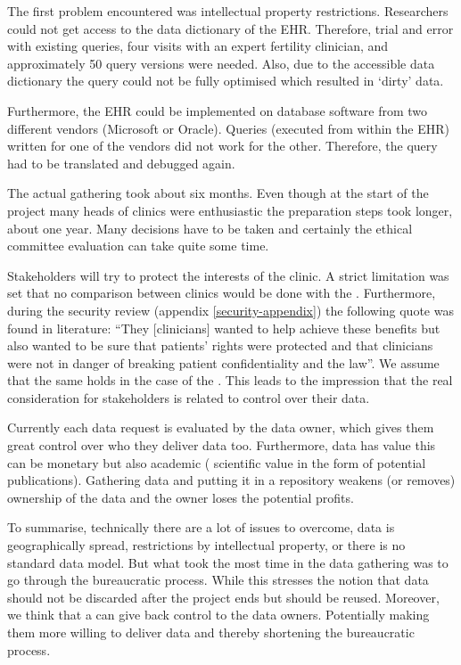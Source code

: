 The first problem encountered was intellectual property restrictions.
Researchers could not get access to the data dictionary of the EHR.
Therefore, trial and error with existing queries, four visits with an expert fertility clinician, and approximately 50 query versions were needed.
Also, due to the accessible data dictionary the query could not be fully optimised which resulted in `dirty' data.

Furthermore, the EHR could be implemented on database software from two different vendors (Microsoft or Oracle).
Queries (executed from within the EHR) written for one of the vendors did not work for the other.
Therefore, the query had to be translated and debugged again.

The actual gathering took about six months.
Even though at the start of the project many heads of clinics were enthusiastic the preparation steps took longer, about one year.
Many decisions have to be taken and certainly the ethical committee evaluation can take quite some time.

Stakeholders will try to protect the interests of the clinic.
A strict limitation was set that no comparison between clinics would be done with the \projectdata{}.
Furthermore, during the security review (appendix \ref{security-appendix}) the following quote was found in literature: ``They [clinicians] wanted to help achieve these benefits but also wanted to be sure that patients' rights were protected and that clinicians were not in danger of breaking patient confidentiality and the law''.
We assume that the same holds in the case of the \project{}.
This leads to the impression that the real consideration for stakeholders is related to control over their data.

Currently each data request is evaluated by the data owner, which gives them great control over who they deliver data too.
Furthermore, data has value this can be monetary but also academic (\ie{} scientific value in the form of potential publications).
Gathering data and putting it in a repository weakens (or removes) ownership of the data and the owner loses the potential profits.

To summarise, technically there are a lot of issues to overcome, \eg{} data is geographically spread, restrictions by intellectual property, or there is no standard data model.
But what took the most time in the \project{} data gathering was to go through the bureaucratic process.
While this stresses the notion that data should not be discarded after the project ends but should be reused.
Moreover, we think that a \ivfsystem{} can give back control to the data owners.
Potentially making them more willing to deliver data and thereby shortening the bureaucratic process.

